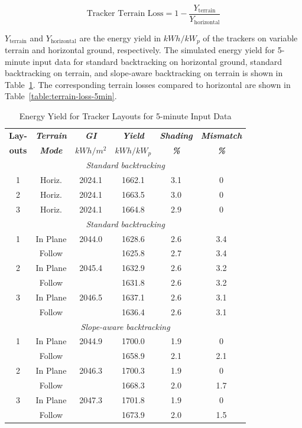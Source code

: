 \documentclass[conference]{IEEEtran}
\begin{document}
\begin{equation}
\text{Tracker Terrain Loss} = 1 - \frac{Y_\text{terrain}}{Y_\text{horizontal}}\label{eq:tracker-terrain-loss}
\end{equation}

$Y_\text{terrain}$ and $Y_\text{horizontal}$ are the energy yield in $kWh/kW_p$ of the trackers on variable terrain and horizontal ground, respectively. The simulated energy yield for 5-minute input data for standard backtracking on horizontal ground, standard backtracking on terrain, and slope-aware backtracking on terrain is shown in Table~\ref{table:energy-5min}. The corresponding terrain losses compared to horizontal are shown in Table~\ref{table:terrain-loss-5min}.

\begin{table}[htbp]
\caption{Energy Yield for Tracker Layouts for 5-minute Input Data}
\begin{center}
\begin{tabular}{|c|c|c|c|c|c|}
\hline
\textbf{Lay-}& \textbf{\textit{Terrain}}& \textbf{\textit{GI}}&        \textbf{\textit{Yield}}&        \textbf{\textit{Shading}}& \textbf{\textit{Mismatch}} \\
\textbf{outs}& \textbf{\textit{Mode}}&    \textbf{\textit{$kWh/m^2$}}& \textbf{\textit{$kWh / kW_p$}}& \textbf{\textit{\%}}&      \textbf{\textit{\%}} \\
\hline
\multicolumn{6}{|c|}{\textit{Standard backtracking}} \\
\hline
1& Horiz.& 2024.1&  1662.1& 3.1& 0 \\
\hline
2& Horiz.& 2024.1&  1663.5& 3.0& 0 \\
 \hline
3& Horiz.& 2024.1&  1664.8& 2.9& 0 \\
\hline
\multicolumn{6}{|c|}{\textit{Standard backtracking}} \\
\hline
1& In Plane& 2044.0&  1628.6& 2.6& 3.4 \\
 & Follow&         &  1625.8& 2.7& 3.4 \\
\hline
2& In Plane& 2045.4&  1632.9& 2.6& 3.2 \\
 & Follow&         &  1631.8& 2.6& 3.2 \\
\hline
3& In Plane& 2046.5&  1637.1& 2.6& 3.1 \\
 & Follow&         &  1636.4& 2.6& 3.1 \\
\hline
\multicolumn{6}{|c|}{\textit{Slope-aware backtracking}} \\
\hline
1& In Plane& 2044.9&  1700.0& 1.9& 0 \\
 & Follow&         &  1658.9& 2.1& 2.1 \\
\hline
2& In Plane& 2046.3&  1700.3& 1.9& 0 \\
 & Follow&         &  1668.3& 2.0& 1.7 \\
\hline
3& In Plane& 2047.3&  1701.8& 1.9& 0 \\
 & Follow&         &  1673.9& 2.0& 1.5 \\
\hline
\end{tabular}
\label{table:energy-5min}
\end{center}
\end{table}
\end{document}
